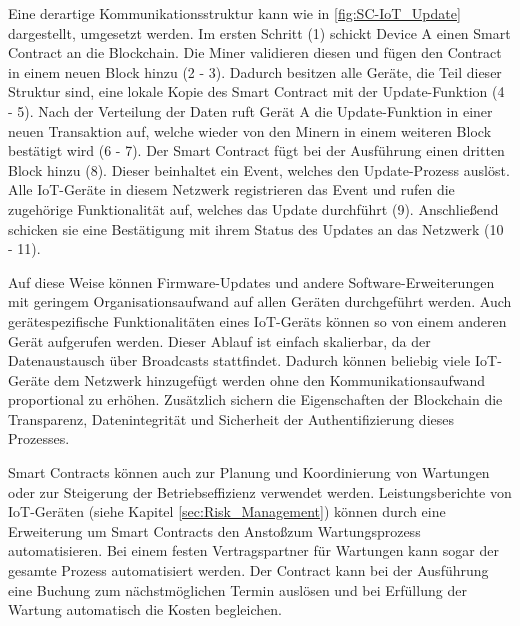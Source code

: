 Eine derartige Kommunikationsstruktur kann wie in \autoref{fig:SC-IoT_Update} dargestellt, umgesetzt werden.
Im ersten Schritt (1) schickt Device A einen Smart Contract an die Blockchain. Die Miner validieren diesen
und fügen den Contract in einem neuen Block hinzu (2 - 3). Dadurch besitzen alle Geräte, die Teil dieser 
Struktur sind, eine lokale Kopie des Smart Contract mit der Update-Funktion (4 - 5).
Nach der Verteilung der Daten ruft Gerät A die Update-Funktion in einer neuen Transaktion auf, welche 
wieder von den Minern in einem weiteren Block bestätigt wird (6 - 7). 
Der Smart Contract fügt bei der Ausführung einen dritten Block hinzu (8). Dieser beinhaltet ein Event,
welches den Update-Prozess auslöst.
Alle IoT-Geräte in diesem Netzwerk registrieren das Event und rufen die zugehörige Funktionalität auf, 
welches das Update durchführt (9). 
Anschlie\ss end schicken sie eine Bestätigung mit ihrem Status des Updates an das Netzwerk (10 - 11).

Auf diese Weise können Firmware-Updates und andere Software-Erweiterungen mit geringem Organisationsaufwand auf allen 
Geräten durchgeführt werden. 
Auch gerätespezifische Funktionalitäten eines IoT-Geräts können so von einem anderen Gerät aufgerufen werden.
Dieser Ablauf ist einfach skalierbar, da der Datenaustausch über Broadcasts stattfindet.  
Dadurch können beliebig viele IoT-Geräte dem Netzwerk hinzugefügt werden ohne den Kommunikationsaufwand 
proportional zu erhöhen. 
Zusätzlich sichern die Eigenschaften der Blockchain die Transparenz, Datenintegrität und Sicherheit der
Authentifizierung dieses Prozesses.
\cite[p.~74f]{Choi2018DeviceControl}


Smart Contracts können auch zur Planung und Koordinierung von Wartungen oder zur Steigerung der 
Betriebseffizienz verwendet werden.
Leistungsberichte von IoT-Geräten (siehe Kapitel \ref{sec:Risk_Management}) können durch eine Erweiterung um 
Smart Contracts den Ansto\ss zum Wartungsprozess automatisieren.
Bei einem festen Vertragspartner für Wartungen kann sogar der gesamte Prozess automatisiert 
werden. 
Der Contract kann bei der Ausführung eine Buchung zum nächstmöglichen Termin auslösen und bei Erfüllung 
der Wartung automatisch die Kosten begleichen.
\cite[p.~169ff]{chowdhary2025smart}

